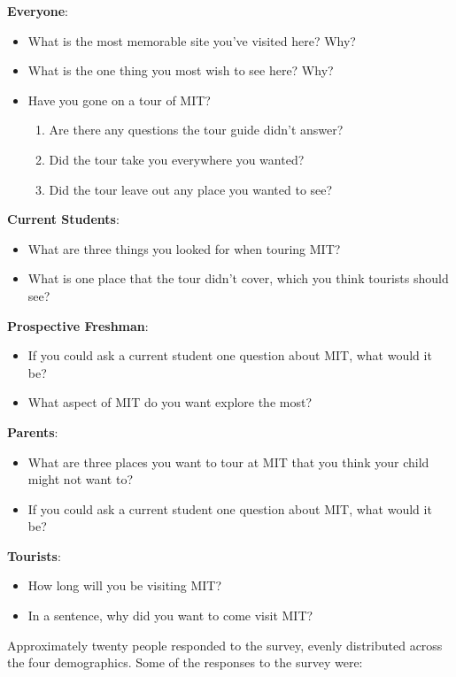 \documentclass{sigchi}
\begin{document}
\textbf{Everyone}:

\begin{itemize}
	\item What is the most memorable site you've visited here? Why?
	\item What is the one thing you most wish to see here? Why?
	\item Have you gone on a tour of MIT?
	\begin{enumerate}
		\item Are there any questions the tour guide didn't answer?
		\item Did the tour take you everywhere you wanted?
		\item Did the tour leave out any place you wanted to see?
	\end{enumerate}
\end{itemize}

\textbf{Current Students}:
\begin{itemize}
	\item What are three things you looked for when touring MIT?
	\item What is one place that the tour didn't cover, which you think tourists should see?
\end{itemize}

\textbf{Prospective Freshman}:
\begin{itemize}
	\item If you could ask a current student one question about MIT, what would it be?
	\item What aspect of MIT do you want explore the most?
\end{itemize}

\textbf{Parents}:
\begin{itemize}
	\item What are three places you want to tour at MIT that you think your child might not want to?
	\item If you could ask a current student one question about MIT, what would it be?
\end{itemize}

\textbf{Tourists}:
\begin{itemize}
	\item How long will you be visiting MIT?
	\item In a sentence, why did you want to come visit MIT?
\end{itemize}

Approximately twenty people responded to the survey, evenly distributed across the four demographics. Some of the responses to the survey were:
\end{document}
